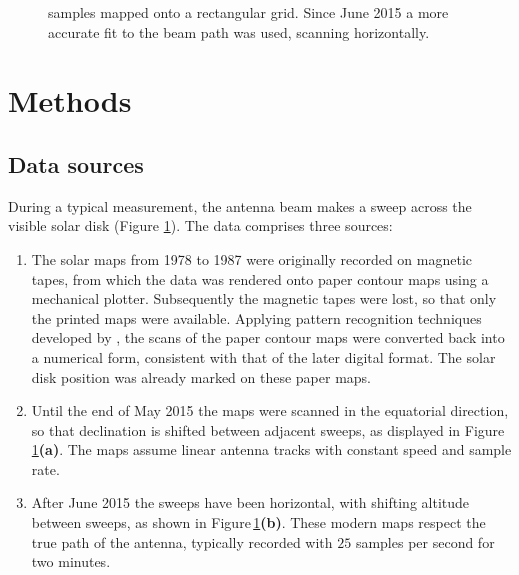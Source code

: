 \documentclass{aa}
\begin{document}
\begin{figure}
{    samples mapped onto a rectangular grid.
    Since June 2015 a more accurate fit to the beam path was used, scanning 
    horizontally.
  \label{oldmap}\label{typicalmap}}
  \end{figure}
\section{Methods}\label{sect:methods}

\subsection{Data sources}\label{sect:source}

  During a typical measurement, the antenna beam makes a sweep across the
  visible solar disk (Figure \ref{typicalmap}).
  The data comprises three sources:
  \begin{enumerate}[A]
    \item
    The solar maps from 1978 to 1987 were originally recorded on magnetic
    tapes, from which the data was rendered onto paper contour maps using a
    mechanical plotter.
    Subsequently the magnetic tapes were lost, so that only the printed maps
    were 
    available. 
    Applying pattern recognition techniques developed by
    \cite{masterthesis}, the scans of the paper contour maps were converted
    back into a numerical form, consistent with that of 
    the later digital format.
    The solar disk position was already marked on these paper maps.
    \item
    Until the end of May 2015 the maps were scanned in the equatorial direction,
    so that declination is shifted between adjacent sweeps, as displayed in
    Figure\,\ref{typicalmap}{\bf(a)}.
    The maps assume linear antenna tracks with constant speed and sample rate.
    \item
    After June 2015 the sweeps have been horizontal, with shifting altitude
    between sweeps, as shown in Figure\,\ref{typicalmap}{\bf(b)}.
    These modern maps respect the true path of the antenna, typically recorded
    with $25$ samples per second for two minutes.
  \end{enumerate}
\end{document}
